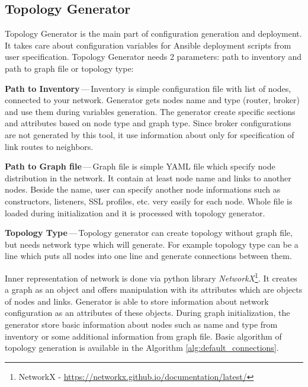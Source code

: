 \subsection{Topology Generator}
Topology Generator is the main part of configuration generation and deployment. It takes care about configuration variables for Ansible deployment scripts from user specification. Topology Generator needs 2 parameters: path to inventory and path to graph file or topology type:

\begin{description}
	\item \textbf{Path to Inventory}\,---\,Inventory is simple configuration file with list of nodes, connected to your network. Generator gets nodes name and type (router, broker) and use them during variables generation. The generator create specific sections and attributes based on node type and graph type. Since broker configurations are not generated by this tool, it use information about only for specification of link routes to neighbors. 
	\item \textbf{Path to Graph file}\,---\,Graph file is simple YAML file which specify node distribution in the network. It contain at least node name and links to another nodes. Beside the name, user can specify another node informations such as constructors, listeners, SSL profiles, etc. very easily for each node. Whole file is loaded during initialization and it is processed with topology generator.
	\item \textbf{Topology Type}\,---\,Topology generator can create topology without graph file, but needs network type which will generate. For example topology type can be a line which puts all nodes into one line and generate connections between them.
\end{description}

Inner representation of network is done via python library \emph{NetworkX}\footnote{NetworkX - \url{https://networkx.github.io/documentation/latest/}}. It creates a graph as an object and offers manipulation with its attributes which are objects of nodes and links. Generator is able to store information about network configuration as an attributes of these objects. During graph initialization, the generator store basic information about nodes such as name and type from inventory or some additional information from graph file. Basic algorithm of topology generation is available in the Algorithm \ref{alg:default_connections}.

